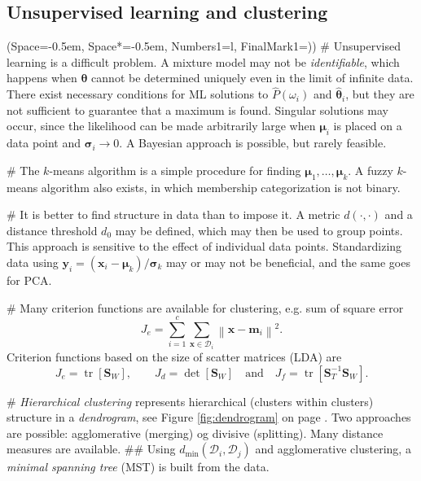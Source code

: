 \documentclass[12pt, a4paper]{article}
\newcommand{\listSpace}{-0.5em}%
\newcommand{\D}{\mathcal{D}}
\newcommand{\vect}[1]{\bm{#1}}
\newcommand{\norm}[1]{\left\lVert#1\right\rVert}
\begin{document}
\subsection{Unsupervised learning and clustering}
\begin{easylist}[itemize]
\ListProperties(Space=\listSpace, Space*=\listSpace, Numbers1=l, FinalMark1={)})
# Unsupervised learning is a difficult problem.
A mixture model may not be \emph{identifiable}, which happens when $\vect{\theta}$ cannot be determined uniquely even in the limit of infinite data.
There exist necessary conditions for ML solutions to $\hat{P}(\omega_i)$ and $\hat{\vect{\theta}}_i$, but they are not sufficient to guarantee that a maximum is found.
Singular solutions may occur, since the likelihood can be made arbitrarily large when $\vect{\mu}_i$ is placed on a data point and $\vect{\sigma}_i \to 0$.
A Bayesian approach is possible, but rarely feasible.

# The $k$-means algorithm is a simple procedure for finding $\vect{\mu}_1, \dots, \vect{\mu}_k$.
A fuzzy $k$-means algorithm also exists, in which membership categorization is not binary.

# It is better to find structure in data than to impose it.
A metric $d(\cdot, \cdot)$ and a distance threshold $d_0$ may be defined, which may then be used to group points.
This approach is sensitive to the effect of individual data points.
Standardizing data using $\vect{y}_i = (\vect{x}_i - \vect{\mu}_k) / \vect{\sigma}_k$ may or may not be beneficial, and the same goes for PCA.

# Many criterion functions are available for clustering, e.g. sum of square error
\begin{equation*}
	J_e = \sum_{i=1}^{c} \sum_{\vect{x} \in \D_i} \norm{\vect{x} - \vect{m}_i}^2.
\end{equation*}
Criterion functions based on the size of scatter matrices (LDA) are
\begin{equation*}
	J_e = \operatorname{tr} \left[ \vect{S}_W \right],
	\qquad
	J_d = \operatorname{det} \left[ \vect{S}_W \right]
	\quad \text{and} \quad
	J_f = \operatorname{tr} \left[ \vect{S}_T^{-1}  \vect{S}_W \right].
\end{equation*}

# \emph{Hierarchical clustering} represents hierarchical (clusters within clusters) structure in a \emph{dendrogram}, see Figure \ref{fig:dendrogram} on page \pageref{fig:dendrogram}.
Two approaches are possible: agglomerative (merging) og divisive (splitting).
Many distance measures are available.
## Using $d_\text{min}(\D_i, \D_j)$ and agglomerative clustering, a \emph{minimal spanning tree} (MST) is built from the data.


\end{easylist}
\end{document}

